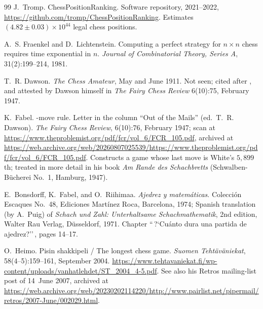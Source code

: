 \documentclass[11pt]{article}
\theoremstyle{definition}
\theoremstyle{remark}
\theoremstyle{plain}
\begin{document}
\begin{thebibliography}{99}
J.~Tromp.
\newblock ChessPositionRanking.
\newblock Software repository, 2021--2022,
  \url{https://github.com/tromp/ChessPositionRanking}. Estimates
  $(4.82 \pm 0.03) \times 10^{44}$ legal chess positions.

A.~S. Fraenkel and D.~Lichtenstein.
\newblock Computing a perfect strategy for $n \times n$ chess requires
  time exponential in $n$.
\newblock \emph{Journal of Combinatorial Theory, Series A},
  31(2):199--214, 1981.

T.~R. Dawson.
\newblock \emph{The Chess Amateur}, May and June 1911. Not seen; cited
  after \cite{bonsdorff1974}, and attested by Dawson himself in
  \emph{The Fairy Chess Review} 6(10):75, February 1947.

K.~Fabel.
-move rule. Letter in the column ``Out of the Mails'' (ed.\
  T.~R. Dawson).
\newblock \emph{The Fairy Chess Review}, 6(10):76, February 1947; scan
  at \url{https://www.theproblemist.org/pdf/fcr/vol_6/FCR_105.pdf},
  archived at
  \url{https://web.archive.org/web/20260807025539/https://www.theproblemist.org/pdf/fcr/vol_6/FCR_105.pdf}.
\newblock Constructs a game whose last move is White's $5{,}899$th;
  treated in more detail in his book \emph{Am Rande des Schachbretts}
  (Schwalben-B\"ucherei No.~1, Hamburg, 1947).

E.~Bonsdorff, K.~Fabel, and O.~Riihimaa.
\newblock \emph{Ajedrez y matem\'aticas}.
\newblock Colecci\'on Escaques No.~48, Ediciones Mart\'inez Roca,
  Barcelona, 1974; Spanish translation (by A.~Puig) of \emph{Schach und
  Zahl: Unterhaltsame Schachmathematik}, 2nd edition, Walter Rau Verlag,
  D\"usseldorf, 1971.
\newblock Chapter ``\,?`Cu\'anto dura una partida de ajedrez?''\,,
  pages 14--17.

O.~Heimo.
\newblock Pisin shakkipeli / The longest chess game.
\newblock \emph{Suomen Teht\"av\"aniekat}, 58(4--5):159--161, September
  2004.
\newblock \url{https://www.tehtavaniekat.fi/wp-content/uploads/vanhatlehdet/ST_2004_4-5.pdf}.
\newblock See also his Retros mailing-list post of 14~June 2007,
  archived at
  \url{https://web.archive.org/web/20230202114220/http://www.pairlist.net/pipermail/retros/2007-June/002029.html}.


\end{thebibliography}
\end{document}
